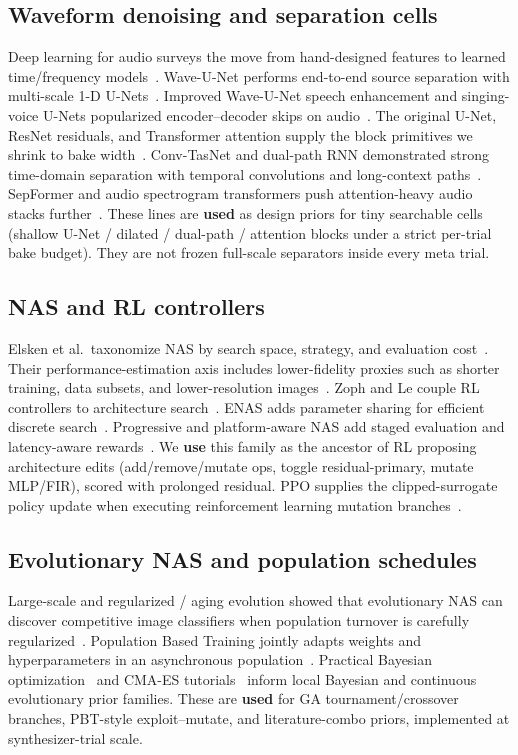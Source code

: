 \subsection{Waveform denoising and separation cells}
Deep learning for audio surveys the move from hand-designed features to learned time/frequency models~\cite{purwins2019}.
Wave-U-Net performs end-to-end source separation with multi-scale 1-D U-Nets~\cite{stoller2018}.
Improved Wave-U-Net speech enhancement and singing-voice U-Nets popularized encoder--decoder skips on audio~\cite{macartney2018,jansson2017}.
The original U-Net, ResNet residuals, and Transformer attention supply the block primitives we shrink to bake width~\cite{ronneberger2015,he2016resnet,vaswani2017}.
Conv-TasNet and dual-path RNN demonstrated strong time-domain separation with temporal convolutions and long-context paths~\cite{luo2019,luo2020dprnn}.
SepFormer and audio spectrogram transformers push attention-heavy audio stacks further~\cite{subakan2021,gong2021ast}.
These lines are \textbf{used} as design priors for tiny searchable cells (shallow U-Net / dilated / dual-path / attention blocks under a strict per-trial bake budget).
They are not frozen full-scale separators inside every meta trial.

\subsection{NAS and RL controllers}
Elsken et al.\ taxonomize NAS by search space, strategy, and evaluation cost~\cite{elsken2019}.
Their performance-estimation axis includes lower-fidelity proxies such as shorter training, data subsets, and lower-resolution images~\cite{elsken2019}.
Zoph and Le couple RL controllers to architecture search~\cite{zoph2017nas}.
ENAS adds parameter sharing for efficient discrete search~\cite{pham2018}.
Progressive and platform-aware NAS add staged evaluation and latency-aware rewards~\cite{liu2018pnas,tan2019mnasnet}.
We \textbf{use} this family as the ancestor of RL proposing architecture edits (add/remove/mutate ops, toggle residual-primary, mutate MLP/FIR), scored with prolonged residual.
PPO supplies the clipped-surrogate policy update when executing reinforcement learning mutation branches~\cite{schulman2017}.

\subsection{Evolutionary NAS and population schedules}
Large-scale and regularized / aging evolution showed that evolutionary NAS can discover competitive image classifiers when population turnover is carefully regularized~\cite{real2017large,real2019}.
Population Based Training jointly adapts weights and hyperparameters in an asynchronous population~\cite{jaderberg2017}.
Practical Bayesian optimization~\cite{snoek2012} and CMA-ES tutorials~\cite{hansen2016cmaes} inform local Bayesian and continuous evolutionary prior families.
These are \textbf{used} for GA tournament/crossover branches, PBT-style exploit--mutate, and literature-combo priors, implemented at synthesizer-trial scale.

